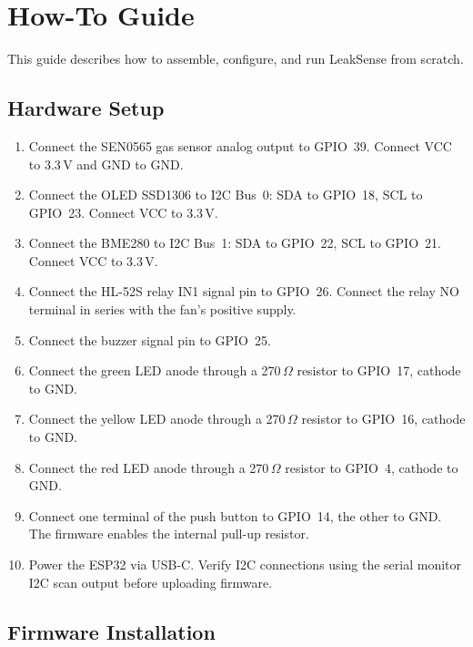 \documentclass[a4paper,10pt,conference,onecolumn]{IEEEtran}
\begin{document}
\section{How-To Guide}
\label{sec:howto}

This guide describes how to assemble, configure, and run LeakSense from
scratch.

\subsection{Hardware Setup}

\begin{enumerate}
  \item Connect the SEN0565 gas sensor analog output to GPIO~39. Connect VCC
        to 3.3\,V and GND to GND.
  \item Connect the OLED SSD1306 to I2C Bus~0: SDA to GPIO~18, SCL to
        GPIO~23. Connect VCC to 3.3\,V.
  \item Connect the BME280 to I2C Bus~1: SDA to GPIO~22, SCL to GPIO~21.
        Connect VCC to 3.3\,V.
  \item Connect the HL-52S relay IN1 signal pin to GPIO~26. Connect the relay
        NO terminal in series with the fan's positive supply.
  \item Connect the buzzer signal pin to GPIO~25.
  \item Connect the green LED anode through a 270\,$\Omega$ resistor to
        GPIO~17, cathode to GND.
  \item Connect the yellow LED anode through a 270\,$\Omega$ resistor to
        GPIO~16, cathode to GND.
  \item Connect the red LED anode through a 270\,$\Omega$ resistor to GPIO~4,
        cathode to GND.
  \item Connect one terminal of the push button to GPIO~14, the other to GND.
        The firmware enables the internal pull-up resistor.
  \item Power the ESP32 via USB-C. Verify I2C connections using the serial
        monitor I2C scan output before uploading firmware.
\end{enumerate}

\subsection{Firmware Installation}
\end{document}
